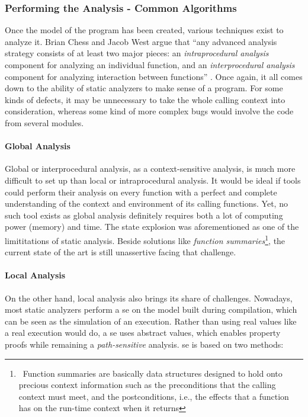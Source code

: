 \subsubsection{Performing the Analysis - Common Algorithms}

Once the model of the program has been created, various techniques exist to analyze it. Brian Chess and Jacob West argue that ``any advanced analysis strategy consists of at least two major pieces: an \emph{intraprocedural analysis} component for analyzing an individual function, and an \emph{interprocedural analysis} component for analyzing interaction between functions'' \cite{chess2007secure}. Once again, it all comes down to the ability of static analyzers to make sense of a program. For some kinds of defects, it may be unnecessary to take the whole calling context into consideration, whereas some kind of more complex bugs would involve the code from several modules.

\paragraph{Global Analysis} Global or interprocedural analysis, as a context-sensitive analysis, is much more difficult to set up than local or intraprocedural analysis. It would be ideal if tools could perform their analysis on every function with a perfect and complete understanding of the context and environment of its calling functions. Yet, no such tool exists as global analysis definitely requires both a lot of computing power (memory) and time. The state explosion was aforementioned as one of the limititations of static analysis. Beside solutions like \emph{function summaries}\footnote{~Function summaries are basically data structures designed to hold onto precious context information such as the preconditions that the calling context must meet, and the postconditions, i.e., the effects that a function has on the run-time context when it returns}, the current state of the art is still unassertive facing that challenge.

\paragraph{Local Analysis} On the other hand, local analysis also brings its share of challenges. Nowadays, most static analyzers perform a \gls{se} on the model built during compilation, which can be seen as the simulation of an execution. Rather than using real values like a real execution would do, a \gls{se} uses abstract values, which enables property proofs while remaining a \emph{path-sensitive} analysis. \Gls{se} is based on two methods:

